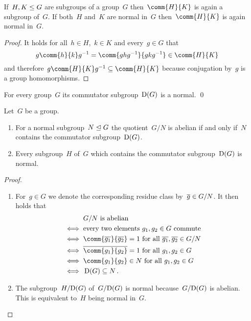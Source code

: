 \begin{lemma}
  If~$H, K \leq G$ are subgroups of a group~$G$ then~$\comm{H}{K}$ is again a subgroup of~$G$.
  If both~$H$ and~$K$ are normal in~$G$ then~$\comm{H}{K}$ is again normal in~$G$.
\end{lemma}


\begin{proof}
  It holds for all~$h \in H$,~$k \in K$ and every~$g \in G$ that
  \[
        g \comm{h}{k} g^{-1}
    =   \comm{ g h g^{-1} }{ g k g^{-1} }
    \in \comm{H}{K}
  \]
  and therefore~$g \comm{H}{K} g^{-1} \subseteq \comm{H}{K}$ because conjugation by~$g$ is a group homomorphisms.
\end{proof}


\begin{corollary}
  For every group~$G$ its commutator subgroup~$\operatorname{D}(G)$ is a normal.
  \qed
\end{corollary}


\begin{lemma}
  Let~$G$ be a group.
  \begin{enumerate}
    \item
      For a normal subgroup~$N \trianglelefteq G$ the quotient~$G/N$ is abelian if and only if~$N$ contains the commutator subgroup~$\operatorname{D}(G)$.
    \item
      Every subgroup~$H$ of~$G$ which contains the commutator subgroup~$\operatorname{D}(G)$ is normal.
  \end{enumerate}
\end{lemma}


\begin{proof}
  \leavevmode
  \begin{enumerate}
    \item
      For~$g \in G$ we denote the corresponding residue class by~$\overline{g} \in G/N$.
      It then holds that
      \begin{align*}
              & \text{$G/N$ is abelian} \\
        \iff{}& \text{every two elements~$g_1, g_2 \in G$ commute}  \\
        \iff{}& \text{$\comm{\class{g_1}}{\class{g_2}} = 1$ for all~$\class{g_1}, \class{g_2} \in G/N$} \\
        \iff{}& \text{$\class{ \comm{g_1}{g_2} } = 1$ for all~$g_1, g_2 \in G$} \\
        \iff{}& \text{$\comm{g_1}{g_2} \in N$ for all~$g_1, g_2 \in G$} \\
        \iff{}& \Derived(G) \subseteq N \,.
      \end{align*}
    \item
      The subgroup~$H/{\operatorname{D}(G)}$ of~$G/{\operatorname{D}(G)}$ is normal because~$G/{\operatorname{D}(G)}$ is abelian.
      This is equivalent to~$H$ being normal in~$G$.
    \qedhere
  \end{enumerate}
\end{proof}


